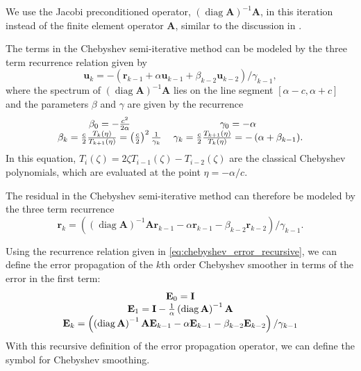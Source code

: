 \documentclass[review]{siamart190516}
\DeclareMathOperator{\diag}{diag}
\begin{document}
We use the Jacobi preconditioned operator, $\left( \diag {\mathbf{A}} \right)^{-1} {\mathbf{A}}$, in this iteration instead of the finite element operator ${\mathbf{A}}$, similar to the discussion in \cite{adams2003parallel}.

The terms in the Chebyshev semi-iterative method can be modeled by the three term recurrence relation given by
\begin{equation}
\mathbf{u}_k = - \left( \mathbf{r}_{k - 1} + \alpha \mathbf{u}_{k - 1} + \beta_{k - 2} \mathbf{u}_{k - 2} \right) / \gamma_{k - 1},
\label{eq:chebyshev_recursive}
\end{equation}
where the spectrum of $\left( \diag {\mathbf{A}} \right)^{-1} {\mathbf{A}}$ lies on the line segment $\left[ \alpha - c, \alpha + c \right]$ and the parameters $\beta$ and $\gamma$ are given by the recurrence
\begin{equation}
\begin{tabular}{c c}
$\beta_0 = - \frac{c^2}{2 \alpha}$ & $\gamma_0 = - \alpha$\\
$\beta_k = \frac{c}{2} \frac{T_k \left( \eta \right)}{T_{k + 1} \left( \eta \right)} = \left( \frac{c}{2} \right)^2 \frac{1}{\gamma_k}$ & $\gamma_k = \frac{c}{2} \frac{T_{k + 1} \left( \eta \right)}{T_k \left( \eta \right)} = - \left( \alpha + \beta_{k - 1} \right)$.
\end{tabular}
\end{equation}
In this equation, $T_i \left( \zeta \right) = 2 \zeta T_{i - 1} \left( \zeta \right) - T_{i - 2} \left( \zeta \right)$ are the classical Chebyshev polynomials, which are evaluated at the point $\eta = - \alpha / c$.

The residual in the Chebyshev semi-iterative method can therefore be modeled by the three term recurrence
\begin{equation}
\mathbf{r}_k = \left( \left( \diag {\mathbf{A}} \right)^{-1} {\mathbf{A}} \mathbf{r}_{k - 1} - \alpha \mathbf{r}_{k - 1} - \beta_{k - 2} \mathbf{r}_{k - 2} \right) / \gamma_{k - 1}.
\label{eq:chebyshev_error_recursive}
\end{equation}

Using the recurrence relation given in \cref{eq:chebyshev_error_recursive}, we can define the error propagation of the $k$th order Chebyshev smoother in terms of the error in the first term:
\begin{equation}
\begin{tabular}{c}
$\mathbf{E}_0 = \mathbf{I}$\\
$\mathbf{E}_1 = \mathbf{I} - \frac{1}{\alpha} \left( \diag {\mathbf{A}} \right)^{-1} {\mathbf{A}}$\\
$\mathbf{E}_k = \left(\left( \diag {\mathbf{A}} \right)^{-1} {\mathbf{A}} \mathbf{E}_{k - 1} - \alpha \mathbf{E}_{k - 1} - \beta_{k - 2} \mathbf{E}_{k - 2} \right) / \gamma_{k - 1}$
\end{tabular}
\label{eq:chebyshev_error_propagation}
\end{equation}
With this recursive definition of the error propagation operator, we can define the symbol for Chebyshev smoothing.
\end{document}
